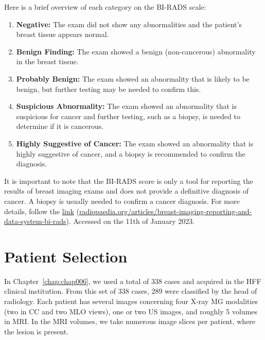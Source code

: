\vspace{1.5mm}

\noindent
Here is a brief overview of each category on the \ac{BI-RADS} scale:

\vspace{0.5mm}

\begin{enumerate}
\item {\bf Negative:} The exam did not show any abnormalities and the patient's breast tissue appears normal.
\item {\bf Benign Finding:} The exam showed a benign (non-cancerous) abnormality in the breast tissue.
\item {\bf Probably Benign:} The exam showed an abnormality that is likely to be benign, but further testing may be needed to confirm this.
\item {\bf Suspicious Abnormality:} The exam showed an abnormality that is suspicious for cancer and further testing, such as a biopsy, is needed to determine if it is cancerous.
\item {\bf Highly Suggestive of Cancer:} The exam showed an abnormality that is highly suggestive of cancer, and a biopsy is recommended to confirm the diagnosis.
\end{enumerate}

\vspace{0.5mm}

It is important to note that the \ac{BI-RADS} score is only a tool for reporting the results of breast imaging exams and does not provide a definitive diagnosis of cancer.
A biopsy is usually needed to confirm a cancer diagnosis.
For more details, follow the \href{https://radiopaedia.org/articles/breast-imaging-reporting-and-data-system-bi-rads}{link} (\href{https://radiopaedia.org/articles/breast-imaging-reporting-and-data-system-bi-rads}{radiopaedia.org/articles/breast-imaging-reporting-and-data-system-bi-rads}).
Accessed on the 11th of January 2023.

\section{Patient Selection}
\label{sec:app001002}

In Chapter~\ref{chap:chap006}, we used a total of 338 cases and acquired in the \ac{HFF} clinical institution.
From this set of 338 cases, 289 were classified by the head of radiology.
Each patient has several images concerning four X-ray \ac{MG} modalities (two in \ac{CC} and two \ac{MLO} views), one or two US images, and roughly 5 volumes in \ac{MRI}.
In the \ac{MRI} volumes, we take numerous image slices per patient, where the lesion is present.

